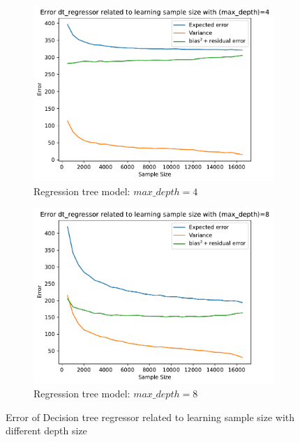 \documentclass[12pt,titlepage]{article}
\begin{document}
\begin{figure}[H]
\begin{subfigure}[t]{.49\textwidth}
        \includegraphics[width =\textwidth]{image/2.4_dt_regressor_4-500-17000-500.pdf}
        \caption{Regression tree model: $max\_depth = 4$}
        \label{fig:ls_dt_4}
    \end{subfigure}
    \hfill
    \begin{subfigure}[t]{.49\textwidth}
        \includegraphics[width =\textwidth]{image/2.4_dt_regressor_8-500-17000-500.pdf}
        \caption{Regression tree model: $max\_depth = 8$}
        \label{fig:ls_dt_8}
    \end{subfigure}
    \caption{Error of Decision tree regressor related to learning sample size with different depth size}
    \label{fig:ls_dt}
\end{figure}
\end{document}
